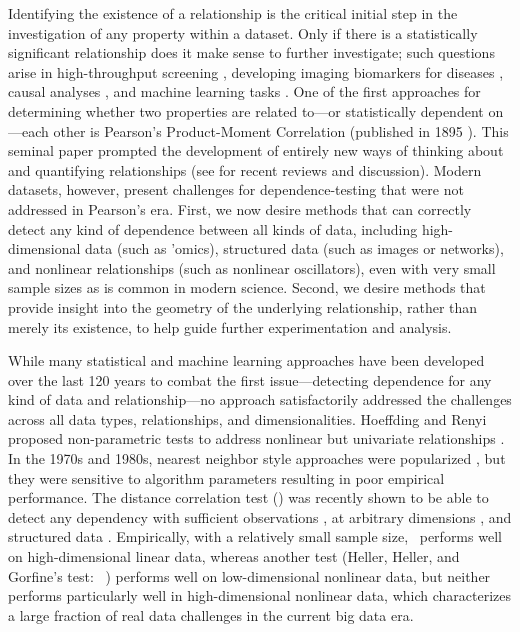 \documentclass[11pt]{extarticle}
\begin{document}
Identifying the existence of a relationship is the critical initial step in the investigation of any property within a dataset. Only if there is a statistically significant relationship does it make sense to further investigate; such questions arise in high-throughput screening \cite{Zhang1999-js}, developing imaging biomarkers for diseases \cite{Prescott2013}, causal analyses \cite{Pearl2000}, and machine learning tasks \cite{HastieTibshiraniBook}.
One of the first approaches for determining whether two properties are related to---or statistically dependent on---each other is Pearson's Product-Moment Correlation (published in 1895 \cite{Pearson1895}). This seminal paper prompted the development of  entirely new ways of thinking about and quantifying relationships (see \cite{Reimherr2013,JosseHolmes2013} for recent reviews and discussion).
Modern datasets, however, present  challenges for dependence-testing that were not addressed in Pearson's era.
First, we now desire methods that can correctly detect any kind of dependence between all kinds of data, including high-dimensional data (such as 'omics), structured data (such as images or networks), and nonlinear relationships (such as nonlinear oscillators), even with very small sample sizes as is common in modern science.  Second, we desire methods that provide  insight into the geometry of the underlying relationship, rather than merely its existence, to help guide further experimentation and analysis.

While many statistical and machine learning approaches have been developed over the last 120 years to combat the first issue---detecting dependence for any kind of data and relationship---no approach satisfactorily addressed the challenges across all data types, relationships, and dimensionalities.
%
Hoeffding and Renyi proposed non-parametric tests to address nonlinear but univariate relationships \cite{Hoeffding1948,Renyi1959}.  In the 1970s and 1980s, nearest neighbor style approaches were popularized \cite{Friedman1983,Schilling1986}, but they were sensitive to {algorithm parameters} resulting in poor empirical performance.
The distance correlation test (\Dcorr) was recently shown to be able to detect any dependency with sufficient observations \cite{SzekelyRizzo2009}, at arbitrary dimensions \cite{SzekelyRizzo2013a}, and structured data \cite{Lyons2013}.
Empirically, with a relatively small sample size, \Dcorr~performs well on high-dimensional linear data, whereas another test (Heller, Heller, and Gorfine's test: \Hhg~\cite{HellerGorfine2013}) performs well on low-dimensional nonlinear data,
but neither performs particularly well in high-dimensional nonlinear data, which characterizes a large fraction of real data challenges in the current big data era.
\end{document}
